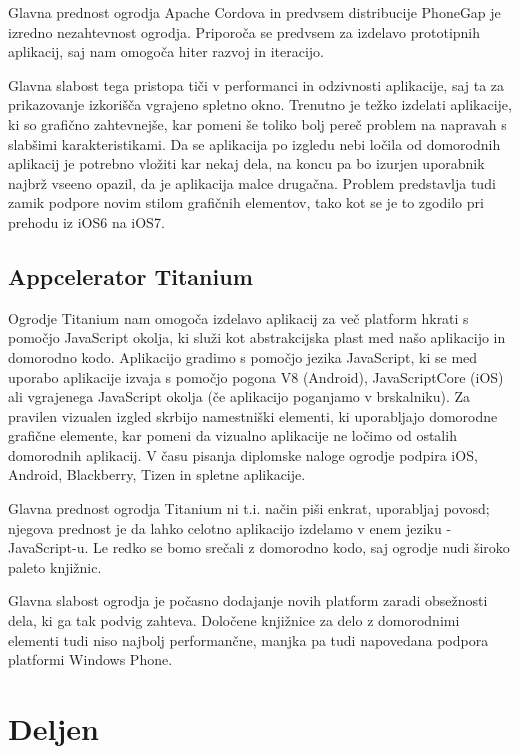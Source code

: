 Glavna prednost ogrodja Apache Cordova in predvsem distribucije PhoneGap je izredno nezahtevnost ogrodja. Priporoča se predvsem za izdelavo prototipnih aplikacij, saj nam omogoča hiter razvoj in iteracijo.

Glavna slabost tega pristopa tiči v performanci in odzivnosti aplikacije, saj ta za prikazovanje izkorišča vgrajeno spletno okno. Trenutno je težko izdelati aplikacije, ki so grafično zahtevnejše, kar pomeni še toliko bolj pereč problem na napravah s slabšimi karakteristikami. Da se aplikacija po izgledu nebi ločila od domorodnih aplikacij je potrebno vložiti kar nekaj dela, na koncu pa bo izurjen uporabnik najbrž vseeno opazil, da je aplikacija malce drugačna. Problem predstavlja tudi zamik podpore novim stilom grafičnih elementov, tako kot se je to zgodilo pri prehodu iz iOS6 na iOS7.

\subsection{Appcelerator Titanium}

Ogrodje Titanium nam omogoča izdelavo aplikacij za več platform hkrati s pomočjo JavaScript okolja, ki služi kot abstrakcijska plast med našo aplikacijo in domorodno kodo. Aplikacijo gradimo s pomočjo jezika JavaScript, ki se med uporabo aplikacije izvaja s pomočjo pogona V8 (Android), JavaScriptCore (iOS) ali vgrajenega JavaScript okolja (če aplikacijo poganjamo v brskalniku). Za pravilen vizualen izgled skrbijo namestniški elementi, ki uporabljajo domorodne grafične elemente, kar pomeni da vizualno aplikacije ne ločimo od ostalih domorodnih aplikacij. V času pisanja diplomske naloge ogrodje podpira iOS, Android, Blackberry, Tizen in spletne aplikacije.

Glavna prednost ogrodja Titanium ni t.i. način piši enkrat, uporabljaj povosd; njegova prednost je da lahko celotno aplikacijo izdelamo v enem jeziku - JavaScript-u. Le redko se bomo srečali z domorodno kodo, saj ogrodje nudi široko paleto knjižnic.

Glavna slabost ogrodja je počasno dodajanje novih platform zaradi obsežnosti dela, ki ga tak podvig zahteva. Določene knjižnice za delo z domorodnimi elementi tudi niso najbolj performančne, manjka pa tudi napovedana podpora platformi Windows Phone.

\section{Deljen}

